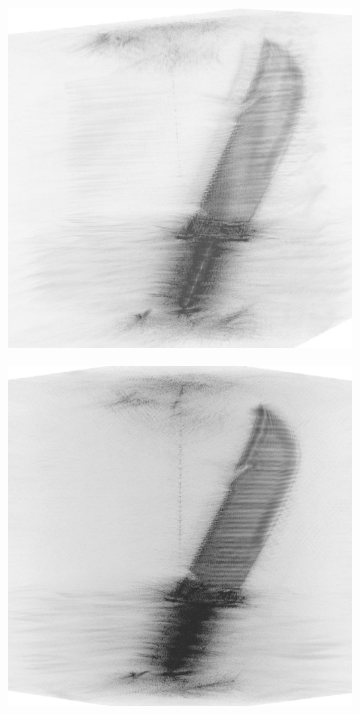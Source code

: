 \documentclass[conference]{IEEEtran}
\begin{document}
		\begin{figure} [h]
			\begin{subfigure}{.5\linewidth}
				\centering
				\includegraphics[width=1\linewidth]{../MatlabResults/knife_SISO_mip}
				\caption{}
				\label{fig:knife_SISO_mip}
			\end{subfigure}%
			\begin{subfigure}{.5\linewidth}
				\centering
				\includegraphics[width=1\linewidth]{../MatlabResults/knife_MIMO_mip}

\end{subfigure}
\end{figure}
\end{document}
